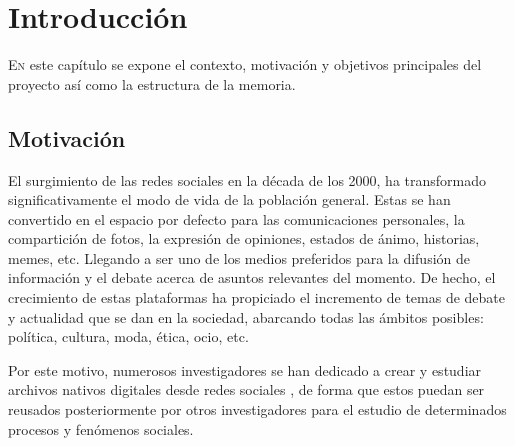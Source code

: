 \chapter{Introducción}
\label{chap:introduccion}
\lettrine{E}{n} este capítulo se expone el contexto, motivación y objetivos principales del proyecto así como la estructura de la memoria.

\section{Motivación}

El surgimiento de las redes sociales en la década de los 2000, ha transformado significativamente el modo de vida de la población general. Estas se han convertido en el espacio por defecto para las comunicaciones personales, la compartición de fotos, la expresión de opiniones, estados de ánimo, historias, memes, etc. Llegando a ser uno de los medios preferidos para la difusión de información y el debate acerca de asuntos relevantes del momento. De hecho, el crecimiento de estas plataformas ha propiciado el incremento de temas de debate y actualidad que se dan en la sociedad, abarcando todas las ámbitos posibles: política, cultura, moda, ética, ocio, etc.

Por este motivo, numerosos investigadores se han dedicado a crear y estudiar archivos nativos digitales desde redes sociales \citep{acker_2014, pybus_2013}, de forma que estos puedan ser reusados posteriormente por otros investigadores para el estudio de determinados procesos y fenómenos sociales.

